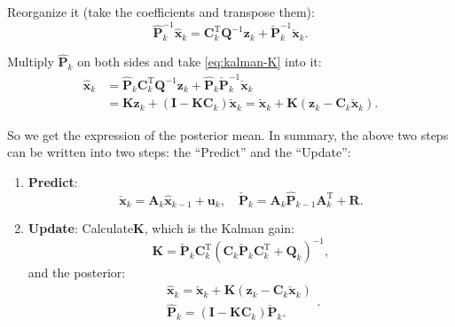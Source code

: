 Reorganize it (take the coefficients and transpose them):
\begin{equation}
	\hat { \mathbf{P}}_k^{ - 1}{{\hat{\mathbf{x}}}_k} = \mathbf{C}_k^\mathrm{T} {\mathbf{Q}^{ - 1}}{\mathbf{z}_k} + \check{\mathbf{P}}_k^{ - 1}{{\mathbf{\check{x}}}_k}.
\end{equation}

Multiply $\mathbf{\hat{P}}_k$ on both sides and take \eqref{eq:kalman-K} into it:
\begin{align}
	{{\mathbf{\hat {x}}}_k} &= {{\hat {\mathbf{P}}}_k} \mathbf{C}_k^\mathrm{T} { \mathbf{Q}^{ - 1}}{\mathbf{z}_k} + {{\mathbf{\hat{ P}}}_k}\check {\mathbf{P}}_k^{ - 1}{{\check {\mathbf{x}}}_k}\\
	&= \mathbf{K} {\mathbf{z}_k} + \left( {\mathbf{I} - \mathbf{K}{\mathbf{C}_k}} \right){{\mathbf{\check {x}}}_k} = {{\check {\mathbf{x}}}_k} + \mathbf{K} \left( {\mathbf{z}_k - {\mathbf{C}_k}{\mathbf{\check{x}}_k}} \right).
\end{align}

So we get the expression of the posterior mean. In summary, the above two steps can be written into two steps:  the ``Predict'' and the ``Update'':
\begin{mdframed}
	\begin{enumerate}
		\item \textbf{Predict}:
		\begin{equation}
			\check{\mathbf{x}}_k = {\mathbf{A}_k {{\hat{\mathbf{x}}}_{k - 1}} + {\mathbf{u}_k}}, \quad \check{\mathbf{P}}_k = {\mathbf{A}_k \hat{\mathbf{P}}_{k-1} { \mathbf{A}^\mathrm{T}_k} + \mathbf{R}}.
		\end{equation}
		\item \textbf{Update}:
		Calculate$\mathbf{K}$, which is the Kalman gain:
		\begin{equation}
			\label{eq:kalman-K-another}
			\mathbf{K} = {{\check {\mathbf{P}}}_k} \mathbf{C}_k^\mathrm{T} {\left( {{\mathbf{C}_k}{{\check {\mathbf{P}}}_k}\mathbf{C}_k^\mathrm{T} + {\mathbf{Q}_k}} \right)^{ - 1}},
		\end{equation}
		and the posterior:
		\begin{equation}
			\begin{array}{l}
				\hat {\mathbf{x}}_k = {{\check {\mathbf{x}}}_k} + \mathbf{K} \left( {\mathbf{z}_k - {\mathbf{C}_k}{\mathbf{\check{x}}_k}} \right)\\
				{{\mathbf{\hat {P}}}_k} = \left( {\mathbf{I} - \mathbf{K}{\mathbf{C}_k}} \right) \check{\mathbf{P}}_k.
			\end{array}.
		\end{equation}
	\end{enumerate}
\end{mdframed}


